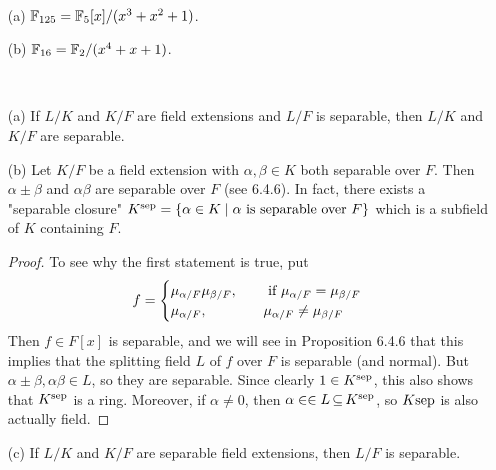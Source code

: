 \documentclass[11pt]{book}
\theoremstyle{definition}   \newtheorem{defn}[counter]{Definition} %
\newcommand{\vs}{\vspace{8pt}}
\numberwithin{counter}{chapter}
\begin{document}
\vs

\begin{example}\ 
\begin{enumerate}
\item[(a)] $\mathbb{F}_{125} = \mathbb{F}_5[x]/(x^3+x^2+1)$. 
\item[(b)] $\mathbb{F}_{16} = \mathbb{F}_2/(x^4+x+1)$. 
\end{enumerate}
\end{example}

\vs

\begin{remark}\ 
\begin{enumerate}
\item[(a)] If $L/K$ and $K/F$ are field extensions and $L/F$ is separable, then $L/K$ and $K/F$ are separable. 
\item[(b)] Let $K/F$ be a field extension with $\alpha, \beta \in K$ both separable over $F$. Then $\alpha \pm \beta$ and $ \alpha \beta$ are separable over $F$ (see 6.4.6). In fact, there exists a "separable closure" $K^{\textnormal{sep}} = \{\alpha \in K \mid \alpha \textnormal{ is separable over } F\}$ which is a subfield of $K$ containing $F$.
\begin{proof}
To see why the first statement is true, put 
	\[f = \begin{cases}
	\mu_{\alpha/F} \mu_{\beta/F}, \quad & \textnormal{ if } \mu_{\alpha/F} = \mu_{\beta/F} \\
	\mu_{\alpha/F}, & \mu_{\alpha/F} \ne \mu_{\beta/F}
	\end{cases}\]
Then $f \in F[x]$ is separable, and we will see in Proposition 6.4.6 that this implies that the splitting field $L$ of $f$ over $F$ is separable (and normal). But $\alpha \pm \beta, \alpha \beta \in L$, so they are separable. Since clearly $1 \in K^{\textnormal{sep}}$, this also shows that $K^{\textnormal{sep}}$ is a ring. Moreover, if $\alpha \ne 0$, then $\alpha \in \in L \operatorname{\subseteq} K^{\textnormal{sep}}$, so $K{\textnormal{sep}}$ is also actually field. 
\end{proof} 

\item[(c)] If $L/K$ and $K/F$ are separable field extensions, then $L/F$ is separable. 
\end{enumerate}
\end{remark}
\end{document}
